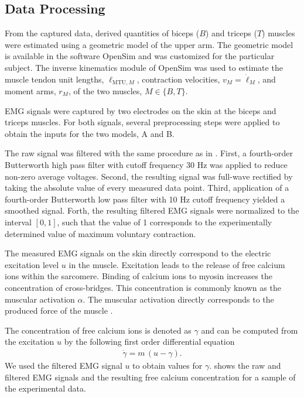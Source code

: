 \subsection{Data Processing}
From the captured data, derived quantities of biceps ($B$) and triceps ($T$) muscles were estimated using a geometric model of the upper arm. 
The geometric model is available in the software OpenSim \cite{OpenSim2007} and was customized for the particular subject. The inverse kinematics module of OpenSim was used to estimate the muscle tendon unit lengths, $\ell_{\text{MTU},M}$, contraction velocities, $v_M=\dot{\ell}_M$, and moment arms, $r_{M}$, of the two muscles, $M\in\{B,T\}$.

EMG signals were captured by two electrodes on the skin at the biceps and triceps muscles. For both signals, several preprocessing steps were applied to obtain the inputs for the two models, A and B.

The raw signal was filtered with the same procedure as in \cite{Falisse2016}. First, a fourth-order Butterworth high pass filter with cutoff frequency 30 Hz was applied to reduce non-zero average voltages. Second, the resulting signal was full-wave rectified by taking the absolute value of every measured data point. Third, application of a fourth-order Butterworth low pass filter with 10 Hz cutoff frequency yielded a smoothed signal.
Forth, the resulting filtered EMG signals were normalized to the interval $[0,1]$, such that the value of 1 corresponds to the experimentally determined value of maximum voluntary contraction.

The measured EMG signals on the skin directly correspond to the electric excitation level $u$ in the muscle. Excitation leads to the release of free calcium ions within the sarcomere. Binding of calcium ions to myosin increases the concentration of cross-bridges. This concentration is commonly known as the muscular activation $\alpha$. The muscular activation directly corresponds to the produced force of the muscle \cite{Bayer2017}.

The concentration of free calcium ions is denoted as $\gamma$ and can be computed from the excitation $u$ by the following first order differential equation \cite{Hatze1977}
%
\begin{equation*}
  \begin{array}{lll}
    \dot{\gamma} = m\,(u - \gamma).
  \end{array}
\end{equation*}
%
We used the filtered EMG signal $u$ to obtain values for $\gamma$.  shows the raw and filtered EMG signals and the resulting free calcium concentration for a sample of the experimental data.

